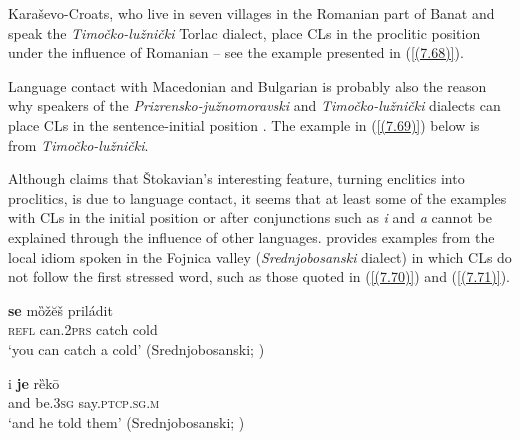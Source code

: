 \noindent Karaševo-Croats, who live in seven villages in the Romanian part of Banat and speak the \textit{Timočko-lužnički} Torlac dialect, place CLs in the proclitic position under the influence of Romanian \citep[cf.][147]{Lisac03} – see the example presented in (\ref{(7.68)}).


\noindent Language contact with Macedonian and Bulgarian is probably also the reason why speakers of the \textit{Prizrensko-južnomoravski} and \textit{Timočko-lužnički} dialects can place CLs in the sentence-initial position \citep[cf.][239--267]{Okuka08}. The example in (\ref{(7.69)}) below is from \textit{Timočko-lužnički}.


\noindent Although \citet[27]{Lisac03} claims that Štokavian’s interesting feature, turning enclitics into proclitics, is due to language contact, it seems that at least some of the examples with CLs in the initial position or after conjunctions such as \textit{i} and \textit{a} cannot be explained through the influence of other languages. \citet[150]{Brozovic07} provides examples from the local idiom spoken in the Fojnica valley (\textit{Srednjobosanski} dialect) in which CLs do not follow the first stressed word, such as those quoted in (\ref{(7.70)}) and (\ref{(7.71)}).

\begin{exe}\ex\label{(7.70)}
\gll \textbf{se}  mȍžĕš  priládit  \\
\textsc{refl}  can.2\textsc{prs}  catch cold \\
\glt ‘you can catch a cold’
\hfill  (Srednjobosanski; \citealt[150]{Brozovic07})

\ex\label{(7.71)}
\gll i  \textbf{je}  rȅkō  \\
and  be.3\textsc{sg}  say.\textsc{ptcp.sg.m}\\
\glt ‘and he told them’
\hfill  (Srednjobosanski; \citealt[150]{Brozovic07})
\end{exe}

